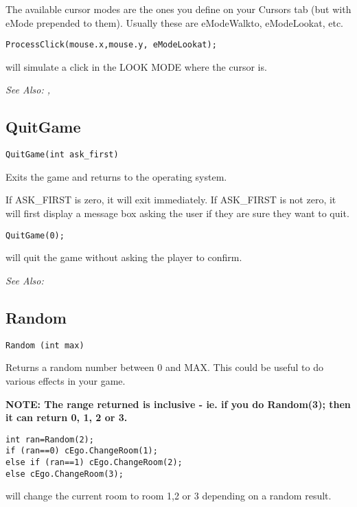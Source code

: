 The available cursor modes are the ones you define on your Cursors tab (but with eMode
prepended to them). Usually these are eModeWalkto, eModeLookat, etc.

\begin{verbatim}
ProcessClick(mouse.x,mouse.y, eModeLookat);
\end{verbatim}
will simulate a click in the LOOK MODE where the cursor is.

\it{See Also:} ,


\subsection{QuitGame}\label{QuitGame}%

\begin{verbatim}
QuitGame(int ask_first)
\end{verbatim}
Exits the game and returns to the operating system.

If ASK_FIRST is zero, it will exit immediately. If ASK_FIRST is not zero,
it will first display a message box asking the user if they are sure they
want to quit.

\begin{verbatim}
QuitGame(0);
\end{verbatim}
will quit the game without asking the player to confirm.

\it{See Also:} 


\subsection{Random}\label{Random}%

\begin{verbatim}
Random (int max)
\end{verbatim}
Returns a random number between 0 and MAX. This could be useful to do
various effects in your game.

\bf{NOTE:} The range returned is inclusive - ie. if you do  Random(3);  then it
can return 0, 1, 2 or 3.

\begin{verbatim}
int ran=Random(2);
if (ran==0) cEgo.ChangeRoom(1);
else if (ran==1) cEgo.ChangeRoom(2);
else cEgo.ChangeRoom(3);
\end{verbatim}
will change the current room to room 1,2 or 3 depending on a random result.


